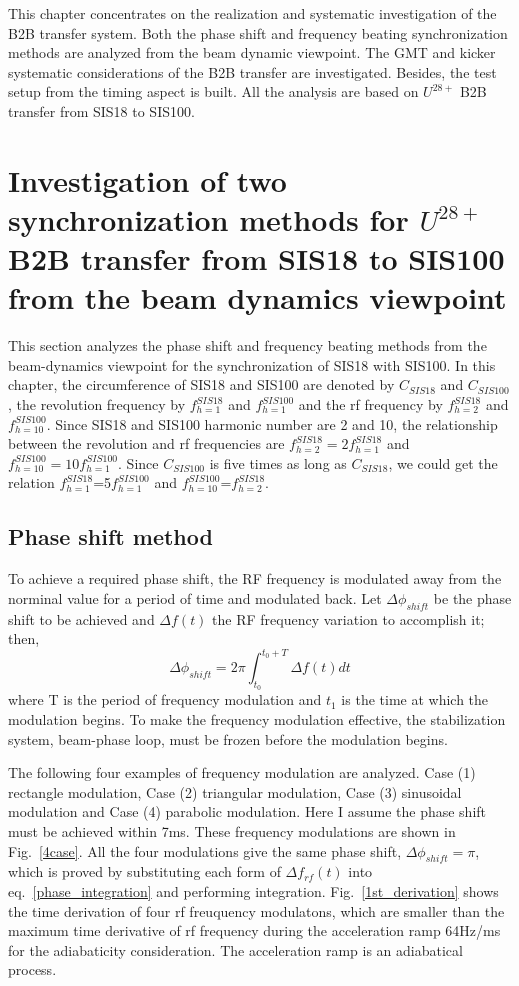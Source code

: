 This chapter concentrates on the realization and systematic investigation of the B2B transfer system. Both the phase shift and frequency beating synchronization methods are analyzed from the beam dynamic viewpoint. The GMT and kicker systematic considerations of the B2B transfer are investigated. Besides, the test setup from the timing aspect is built. All the analysis are based on $U^{28+}$ B2B transfer from SIS18 to SIS100.
\section{Investigation of two synchronization methods for $U^{28+}$ B2B transfer from SIS18 to SIS100 from the beam dynamics viewpoint }
This section analyzes the phase shift and frequency beating methods from the beam-dynamics viewpoint for the synchronization of SIS18 with SIS100. In this chapter, the circumference of SIS18 and SIS100 are denoted by $C_{SIS18}$ and $C_{SIS100}$, the revolution frequency by $f_{h=1}^{SIS18}$ and $f_{h=1}^{SIS100}$ and the rf frequency by $f_{h=2}^{SIS18}$ and $f_{h=10}^{SIS100}$. Since SIS18 and SIS100 harmonic number are 2 and 10, the relationship between the revolution and rf frequencies are $f_{h=2}^{SIS18}=2f_{h=1}^{SIS18}$ and $f_{h=10}^{SIS100}=10f_{h=1}^{SIS100}$. Since $C_{SIS100}$ is five times as long as $C_{SIS18}$, we could get the relation  $f_{h=1}^{SIS18}$=5$f_{h=1}^{SIS100}$ and $f_{h=10}^{SIS100}$=$f_{h=2}^{SIS18}$.
\subsection{Phase shift method}
To achieve a required phase shift, the RF frequency is modulated away from the norminal value for a period of time and modulated back. Let $\Delta \phi_{shift}$ be the phase shift to be achieved and $\Delta f(t)$ the RF frequency variation to accomplish it; then,
\begin{equation}
\Delta \phi_{shift}= 2\pi \int_{t_0}^{t_0+T} \Delta f(t)dt \label{phase_integration}
\end{equation}
where T is the period of frequency modulation and $t_1$ is the time at which the modulation begins. To make the frequency modulation effective, the stabilization system, beam-phase loop, must be frozen before the modulation begins. 

The following four examples of frequency modulation are analyzed. Case (1) rectangle modulation, Case (2) triangular modulation, Case (3) sinusoidal modulation and Case (4) parabolic modulation. Here I assume the phase shift must be achieved within 7ms. These frequency modulations are shown in Fig.~\ref{4case}. All the four modulations give the same phase shift, $\Delta \phi_{shift}=\pi$, which is
proved by substituting each form of $\Delta f_{rf}(t)$ into eq.~\ref{phase_integration} and performing integration. Fig.~\ref{1st_derivation} shows the time derivation of four rf freuquency modulatons, which are smaller than the maximum time derivative of rf frequency during the acceleration ramp 64Hz/ms for the adiabaticity consideration. The acceleration ramp is an adiabatical process.

